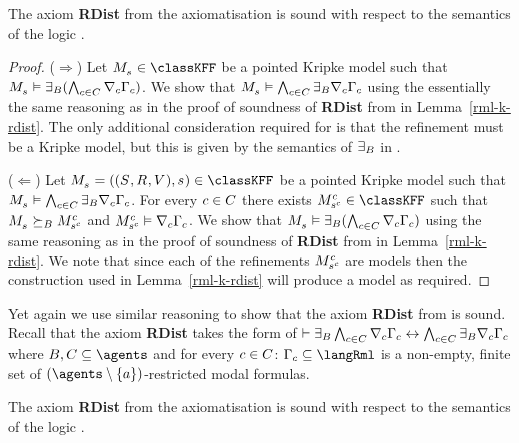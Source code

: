 \begin{lemma}\label{rml-k45-rdist}
The axiom {\bf RDist} from the axiomatisation \axiomRmlKFF{} is sound with respect to the semantics of the logic \logicRmlKFF{}.
\end{lemma}

\begin{proof}
($\Rightarrow$) Let $\kPModel{\kStateS} \in \classKFF$ be a pointed Kripke model such that $\kPModel{\kStateS} \entails \somerefsBs ( \bigwedge_{\agentC \in \agentsC} \coversC \Gamma_\agentC )$.
We show that $\kPModel{\kStateS} \entails \bigwedge_{\agentC \in \agentsC} \somerefsBs \coversC \Gamma_\agentC$ using the essentially the same reasoning as in the proof of soundness of {\bf RDist} from \axiomRmlK{} in Lemma~\ref{rml-k-rdist}.
The only additional consideration required for \logicRmlKFF{} is that the refinement must be a \classKFF{} Kripke model, but this is given by the semantics of $\somerefsBs$ in \logicRmlKFF{}.

($\Leftarrow$) Let $\kPModelAndTuple{\kStateS} \in \classKFF$ be a pointed Kripke model such that $\kPModel{\kStateS} \entails \bigwedge_{\agentC \in \agentsC} \somerefsBs \coversC \Gamma_\agentC$.
For every $\agentC \in \agentsC$ there exists $\kPModel[\agentC]{\kStateS[\agentC]} \in \classKFF$ such that $\kPModel{\kStateS} \simulatesBs \kPModel[\agentC]{\kStateS[\agentC]}$ and $\kPModel[\agentC]{\kStateS[\agentC]} \entails \coversC \Gamma_\agentC$.
We show that $\kPModel{\kStateS} \entails \somerefsBs ( \bigwedge_{\agentC \in \agentsC} \coversC \Gamma_\agentC)$ using the same reasoning as in the proof of soundness of {\bf RDist} from \axiomRmlK{} in Lemma~\ref{rml-k-rdist}.
We note that since each of the refinements $\kPModel[\agentC]{\kStateS[\agentC]}$ are \classKFF{} models then the construction used in Lemma~\ref{rml-k-rdist} will produce a \classKFF{} model as required.
\end{proof}

Yet again we use similar reasoning to show that the axiom {\bf RDist} from \axiomRmlKD{} is sound.
Recall that the axiom {\bf RDist} takes the form of $\proves \somerefsBs \bigwedge_{\agentC \in \agentsC} \coversC \Gamma_\agentC \iff \bigwedge_{\agentC \in \agentsC} \somerefsBs \coversC \Gamma_\agentC$ where $\agentsB, \agentsC \subseteq \agents$ and for every $\agentC \in \agentsC$: $\Gamma_\agentC \subseteq \langRml$ is a non-empty, finite set of $(\agents \setminus \{\agentA\})$-restricted modal formulas.

\begin{lemma}\label{rml-kd45-rdist}
The axiom {\bf RDist} from the axiomatisation \axiomRmlKFF{} is sound with respect to the semantics of the logic \logicRmlKFF{}.
\end{lemma}

